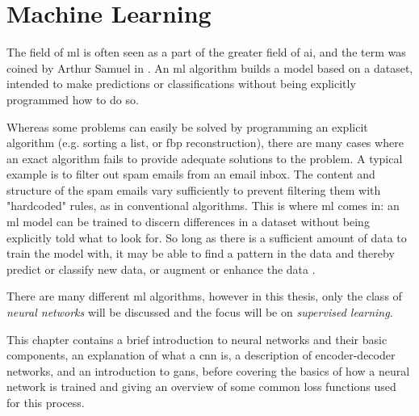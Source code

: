 \chapter{Machine Learning}
\label{sec:ml}
The field of \gls{ml} is often seen as a part of the greater field of \gls{ai}\cite[3]{Alpaydin10}, and the term was coined by Arthur Samuel in \citeyear{samuelmachinelearning} \cite{samuelmachinelearning}. An \gls{ml} algorithm builds a model based on a dataset, intended to make predictions or classifications without being explicitly programmed how to do so. 

Whereas some problems can easily be solved by programming an explicit algorithm (e.g. sorting a list, or \gls{fbp} reconstruction), there are many cases where an exact algorithm fails to provide adequate solutions to the problem. A typical example is to filter out spam emails from an email inbox. The content and structure of the spam emails vary sufficiently to prevent filtering them with "hardcoded" rules, as in conventional algorithms. This is where \gls{ml} comes in: an \gls{ml} model can be trained to discern differences in a dataset without being explicitly told what to look for. So long as there is a sufficient amount of data to train the model with, it may be able to find a pattern in the data and thereby predict or classify new data, or augment or enhance the data \cite[2-4]{Alpaydin10}. 

There are many different \gls{ml} algorithms, however in this thesis, only the class of \textit{neural networks} will be discussed and the focus will be on \textit{supervised learning}. 

This chapter contains a brief introduction to neural networks and their basic components, an explanation of what a \acrlong{cnn} is, a description of encoder-decoder networks, and an introduction to \acrlong{gan}s, before covering the basics of how a neural network is trained and giving an overview of some common loss functions used for this process. 

